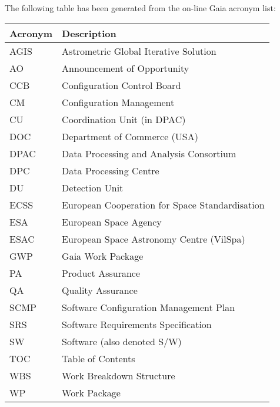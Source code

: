 The following table has been generated from the on-line Gaia acronym list:
\newline\newline%
\addtocounter{table}{-1}
\begin{longtable}{|l|p{}|}\hline 
\textbf{Acronym} & \textbf{Description}  \\\hline
AGIS&Astrometric Global Iterative Solution \\\hline
AO&Announcement of Opportunity \\\hline
CCB&Configuration Control Board \\\hline
CM&Configuration Management \\\hline
CU&Coordination Unit (in DPAC) \\\hline
DOC&Department of Commerce (USA) \\\hline
DPAC&Data Processing and Analysis Consortium \\\hline
DPC&Data Processing Centre \\\hline
DU&Detection Unit \\\hline
ECSS&European Cooperation for Space Standardisation \\\hline
ESA&European Space Agency \\\hline
ESAC&European Space Astronomy Centre (VilSpa) \\\hline
GWP&Gaia Work Package \\\hline
PA&Product Assurance \\\hline
QA&Quality Assurance \\\hline
SCMP&Software Configuration Management Plan \\\hline
SRS&Software Requirements Specification \\\hline
SW&Software (also denoted S/W) \\\hline
TOC&Table of Contents \\\hline
WBS&Work Breakdown Structure \\\hline
WP&Work Package \\\hline
\end{longtable} 
